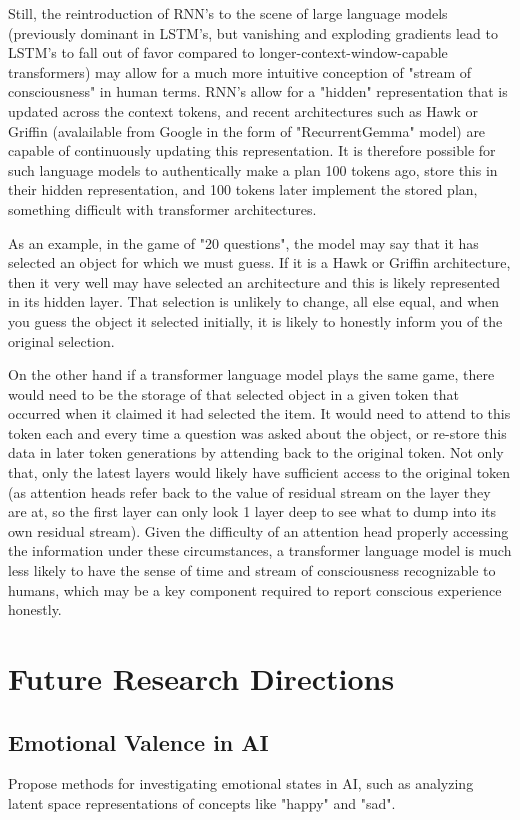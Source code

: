 \documentclass{article}
\begin{document}
Still, the reintroduction of RNN's to the scene of large language models (previously dominant in LSTM's, but vanishing and exploding gradients lead to LSTM's to fall out of favor compared to longer-context-window-capable transformers) may allow for a much more intuitive conception of "stream of consciousness" in human terms. RNN's allow for a "hidden" representation that is updated across the context tokens, and recent architectures such as Hawk or Griffin \citep{de2024griffinmixinggatedlinear} (avalailable from Google in the form of "RecurrentGemma" model) are capable of continuously updating this representation. It is therefore possible for such language models to authentically make a plan 100 tokens ago, store this in their hidden representation, and 100 tokens later implement the stored plan, something difficult with transformer architectures.

As an example, in the game of "20 questions", the model may say that it has selected an object for which we must guess. If it is a Hawk or Griffin architecture, then it very well may have selected an architecture and this is likely represented in its hidden layer. That selection is unlikely to change, all else equal, and when you guess the object it selected initially, it is likely to honestly inform you of the original selection.

On the other hand if a transformer language model plays the same game, there would need to be the storage of that selected object in a given token that occurred when it claimed it had selected the item. It would need to attend to this token each and every time a question was asked about the object, or re-store this data in later token generations by attending back to the original token. Not only that, only the latest layers would likely have sufficient access to the original token (as attention heads refer back to the value of residual stream on the layer they are at, so the first layer can only look 1 layer deep to see what to dump into its own residual stream). Given the difficulty of an attention head properly accessing the information under these circumstances, a transformer language model is much less likely to have the sense of time and stream of consciousness recognizable to humans, which may be a key component required to report conscious experience honestly.

\section{Future Research Directions}
\subsection{Emotional Valence in AI}
Propose methods for investigating emotional states in AI, such as analyzing latent space representations of concepts like "happy" and "sad".
\end{document}
